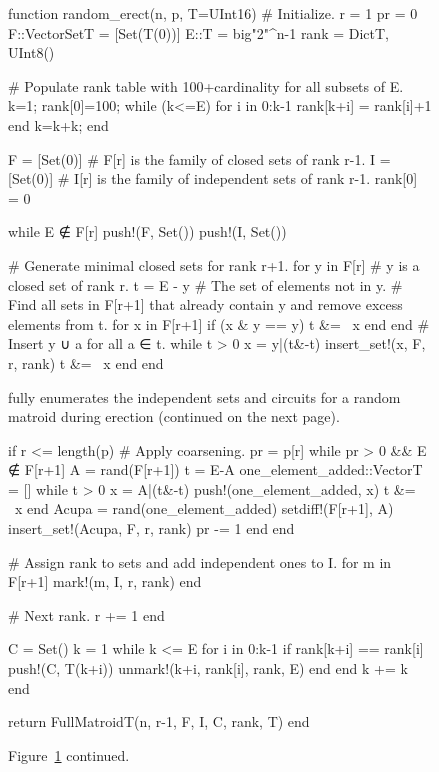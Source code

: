 \begin{figure}
  \begin{jllisting}
function random_erect(n, p, T=UInt16)
  # Initialize.
  r = 1
  pr = 0
  F::Vector{Set{T}} = [Set(T(0))]
  E::T = big"2"^n-1
  rank = Dict{T, UInt8}()
  
  # Populate rank table with 100+cardinality for all subsets of E.
  k=1; rank[0]=100;
  while (k<=E)
    for i in 0:k-1 rank[k+i] = rank[i]+1 end
    k=k+k;
  end
  
  F = [Set(0)] # F[r] is the family of closed sets of rank r-1.
  I = [Set(0)] # I[r] is the family of independent sets of rank r-1.
  rank[0] = 0
  
  while E ∉ F[r]
    push!(F, Set())
    push!(I, Set())
    
    # Generate minimal closed sets for rank r+1.
    for y in F[r] # y is a closed set of rank r.
      t = E - y # The set of elements not in y.
      # Find all sets in F[r+1] that already contain y and remove excess elements from t.
      for x in F[r+1]
        if (x & y == y) t &= ~x end
      end
      # Insert y ∪ a for all a ∈ t.
      while t > 0
        x = y|(t&-t)
        insert_set!(x, F, r, rank)
        t &= ~x
      end
    end
  \end{jllisting}
  \caption{ fully enumerates the independent sets and circuits for a random matroid during erection (continued on the next page).}
  \label{code:random_erect}
\end{figure}

\begin{figure}
  \begin{jllisting}
    if r <= length(p)
      # Apply coarsening.
      pr = p[r]
      while pr > 0 && E ∉ F[r+1]
        A = rand(F[r+1])
        t = E-A
        one_element_added::Vector{T} = []
        while t > 0
          x = A|(t&-t)
          push!(one_element_added, x)
          t &= ~x
        end
        Acupa = rand(one_element_added)
        setdiff!(F[r+1], A)
        insert_set!(Acupa, F, r, rank)
        pr -= 1
      end
    end
    
    # Assign rank to sets and add independent ones to I.
    for m in F[r+1]
      mark!(m, I, r, rank)
    end
    
    # Next rank.
    r += 1
  end

  C = Set()
  k = 1
  while k <= E
    for i in 0:k-1 if rank[k+i] == rank[i]
      push!(C, T(k+i))
      unmark!(k+i, rank[i], rank, E)
    end end
    k += k
  end

  return FullMatroid{T}(n, r-1, F, I, C, rank, T)
end
  \end{jllisting}
  \caption*{Figure~\ref{code:random_erect} continued.}
\end{figure}